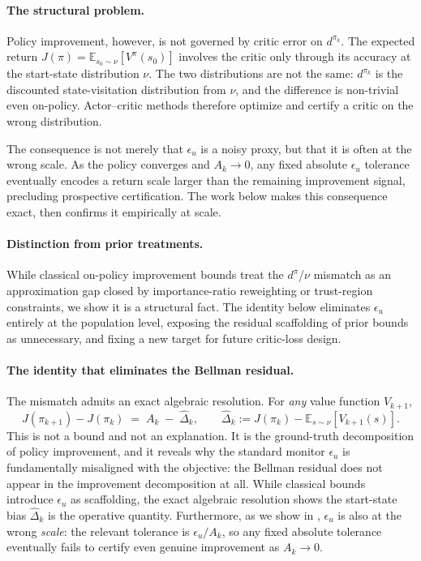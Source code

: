 \documentclass{article}
\begin{document}
\paragraph{The structural problem.}
Policy improvement, however, is not governed by critic error on $d^{\pi_k}$. The expected return $J(\pi) = \mathbb{E}_{s_0 \sim \nu}[V^\pi(s_0)]$ involves the critic only through its accuracy at the start-state distribution $\nu$. The two distributions are not the same: $d^{\pi_k}$ is the discounted state-visitation distribution from $\nu$, and the difference is non-trivial even on-policy. Actor--critic methods therefore optimize and certify a critic on the wrong distribution.

The consequence is not merely that $\epsilon_u$ is a noisy proxy, but that it is often at the wrong scale. As the policy converges and $A_k \to 0$, any fixed absolute $\epsilon_u$ tolerance eventually encodes a return scale larger than the remaining improvement signal, precluding prospective certification. The work below makes this consequence exact, then confirms it empirically at scale.

\paragraph{Distinction from prior treatments.}
While classical on-policy improvement bounds treat the $d^\pi$/$\nu$ mismatch as an approximation gap closed by importance-ratio reweighting or trust-region constraints, we show it is a structural fact. The identity below eliminates $\epsilon_u$ entirely at the population level, exposing the residual scaffolding of prior bounds as unnecessary, and fixing a new target for future critic-loss design.

\paragraph{The identity that eliminates the Bellman residual.}
The mismatch admits an exact algebraic resolution. For \emph{any} value function $V_{k+1}$,
\begin{equation}
\label{eq:identity-intro}
J(\pi_{k+1}) - J(\pi_k) \;=\; A_k \;-\; \hat\Delta_k,\qquad
\hat\Delta_k := J(\pi_k) - \mathbb{E}_{s \sim \nu}[V_{k+1}(s)].
\end{equation}
This is not a bound and not an explanation. It is the ground-truth decomposition of policy improvement, and it reveals why the standard monitor $\epsilon_u$ is fundamentally misaligned with the objective: the Bellman residual does not appear in the improvement decomposition at all. While classical bounds introduce $\epsilon_u$ as scaffolding, the exact algebraic resolution shows the start-state bias $\hat\Delta_k$ is the operative quantity. Furthermore, as we show in , $\epsilon_u$ is also at the wrong \emph{scale}: the relevant tolerance is $\epsilon_u / A_k$, so any fixed absolute tolerance eventually fails to certify even genuine improvement as $A_k \to 0$.
\end{document}

